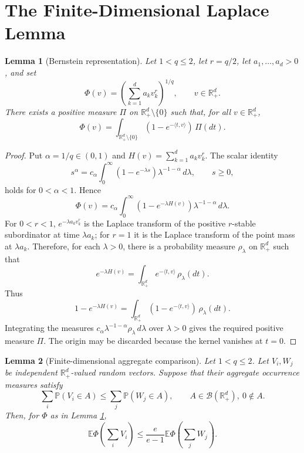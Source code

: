 \documentclass[11pt]{article}
\newtheorem{lemma}{Lemma}
\newcommand{\E}{\mathbb E}
\newcommand{\Pp}{\mathbb P}
\newcommand{\R}{\mathbb R}
\newcommand{\cB}{\mathcal B}
\begin{document}
\section*{The Finite-Dimensional Laplace Lemma}

\begin{lemma}[Bernstein representation]
\label{lem:bernstein}
Let \(1<q\le2\), let \(r=q/2\), let \(a_1,\ldots,a_d>0\), and set
\[
  \Phi(v)=\left(\sum_{k=1}^d a_k v_k^r\right)^{1/q},
  \qquad v\in\R_+^d.
\]
There exists a positive measure \(\Pi\) on
\(\R_+^d\setminus\{0\}\) such that, for all \(v\in\R_+^d\),
\[
  \Phi(v)=
  \int_{\R_+^d\setminus\{0\}}
     \left(1-e^{-\langle t,v\rangle}\right)\,\Pi(dt).
\]
\end{lemma}

\begin{proof}
Put \(\alpha=1/q\in(0,1)\) and
\(H(v)=\sum_{k=1}^d a_k v_k^r\).  The scalar identity
\[
  s^\alpha
  =
  c_\alpha\int_0^\infty (1-e^{-\lambda s})\lambda^{-1-\alpha}\,d\lambda,
  \qquad s\ge0,
\]
holds for \(0<\alpha<1\).  Hence
\[
  \Phi(v)
  =
  c_\alpha\int_0^\infty
       \left(1-e^{-\lambda H(v)}\right)
       \lambda^{-1-\alpha}\,d\lambda.
\]
For \(0<r<1\), \(e^{-\lambda a_k v_k^r}\) is the Laplace transform of the
positive \(r\)-stable subordinator at time \(\lambda a_k\); for \(r=1\) it is
the Laplace transform of the point mass at \(\lambda a_k\).  Therefore, for
each \(\lambda>0\), there is a probability measure \(\rho_\lambda\) on
\(\R_+^d\) such that
\[
  e^{-\lambda H(v)}
  =
  \int_{\R_+^d} e^{-\langle t,v\rangle}\,\rho_\lambda(dt).
\]
Thus
\[
  1-e^{-\lambda H(v)}
  =
  \int_{\R_+^d}
      \left(1-e^{-\langle t,v\rangle}\right)\,\rho_\lambda(dt).
\]
Integrating the measures \(c_\alpha\lambda^{-1-\alpha}\rho_\lambda\,d\lambda\)
over \(\lambda>0\) gives the required positive measure \(\Pi\).  The origin
may be discarded because the kernel vanishes at \(t=0\).
\end{proof}

\begin{lemma}[Finite-dimensional aggregate comparison]
\label{lem:finite}
Let \(1<q\le2\).  Let \(V_i,W_j\) be independent \(\R_+^d\)-valued random
vectors.  Suppose that their aggregate occurrence measures satisfy
\[
  \sum_i \Pp(V_i\in A)
  \le
  \sum_j \Pp(W_j\in A),
  \qquad A\in\cB(\R_+^d),\ 0\notin A.
\]
Then, for \(\Phi\) as in Lemma \ref{lem:bernstein},
\[
  \E\Phi\left(\sum_i V_i\right)
  \le
  \frac{e}{e-1}
  \E\Phi\left(\sum_j W_j\right).
\]
\end{lemma}
\end{document}
